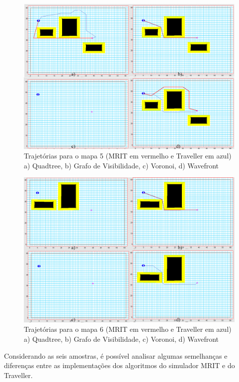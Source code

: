 \begin{figure}[h]
	\centering
	\label{fig43}
		\includegraphics[keepaspectratio=true,scale=0.25]{figuras/mapa5.jpg}
	\caption{Trajetórias para o mapa 5 (MRIT em vermelho e Traveller em azul) a) Quadtree, b) Grafo de Visibilidade, c) Voronoi, d) Wavefront}
\end{figure}

\begin{figure}[h]
	\centering
	\label{fig44}
		\includegraphics[keepaspectratio=true,scale=0.25]{figuras/mapa6.jpg}
	\caption{Trajetórias para o mapa 6 (MRIT em vermelho e Traveller em azul) a) Quadtree, b) Grafo de Visibilidade, c) Voronoi, d) Wavefront}
\end{figure}

Considerando as seis amostras, é possível analisar algumas semelhanças e diferenças entre as implementações dos algoritmos do simulador MRIT e do Traveller.

